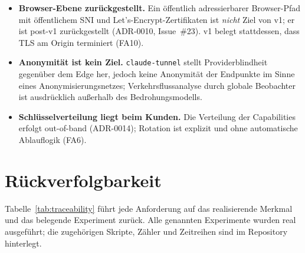 \begin{itemize}
  \item \textbf{Browser-Ebene zurückgestellt.} Ein öffentlich adressierbarer
    Browser-Pfad mit öffentlichem SNI und Let's-Encrypt-Zertifikaten ist \emph{nicht}
    Ziel von v1; er ist post-v1 zurückgestellt (ADR-0010, Issue~\#23). v1 belegt
    stattdessen, dass TLS am Origin terminiert (FA10).
  \item \textbf{Anonymität ist kein Ziel.} \texttt{claude-tunnel} stellt
    Providerblindheit gegenüber dem Edge her, jedoch keine Anonymität der Endpunkte im
    Sinne eines Anonymisierungsnetzes; Verkehrsflussanalyse durch globale Beobachter ist
    ausdrücklich außerhalb des Bedrohungsmodells.
  \item \textbf{Schlüsselverteilung liegt beim Kunden.} Die Verteilung der Capabilities
    erfolgt out-of-band (ADR-0014); Rotation ist explizit und ohne automatische
    Ablauflogik (FA6).
\end{itemize}

\section{Rückverfolgbarkeit}\label{sec:traceability}

Tabelle~\ref{tab:traceability} führt jede Anforderung auf das realisierende Merkmal und
das belegende Experiment zurück. Alle genannten Experimente wurden real ausgeführt; die
zugehörigen Skripte, Zähler und Zeitreihen sind im Repository hinterlegt.

